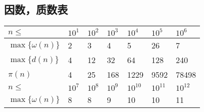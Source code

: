 \documentclass[twoside]{article}
\begin{document}
\subsection{因数，质数表}
\begin{table}[H]
\centering
\begin{tabular}{|l|llllll|}
\hline
\rowcolor[HTML]{C0C0C0} 
$n\le$              & \multicolumn{1}{l|}{\cellcolor[HTML]{C0C0C0}$10^1$}  & \multicolumn{1}{l|}{\cellcolor[HTML]{C0C0C0}$10^2$}  & \multicolumn{1}{l|}{\cellcolor[HTML]{C0C0C0}$10^3$}  & \multicolumn{1}{l|}{\cellcolor[HTML]{C0C0C0}$10^4$}    & \multicolumn{1}{l|}{\cellcolor[HTML]{C0C0C0}$10^5$}  & \cellcolor[HTML]{C0C0C0}$10^6$ \\ \hline
$\max\{\omega(n)\}$ & \multicolumn{1}{l|}{2}                               & \multicolumn{1}{l|}{3}                               & \multicolumn{1}{l|}{4}                               & \multicolumn{1}{l|}{5}                                 & \multicolumn{1}{l|}{26}                              & 7                              \\ \hline
$\max\{d(n)\}$      & \multicolumn{1}{l|}{4}                               & \multicolumn{1}{l|}{12}                              & \multicolumn{1}{l|}{32}                              & \multicolumn{1}{l|}{64}                                & \multicolumn{1}{l|}{128}                             & 240                            \\ \hline
$\pi(n)$            & \multicolumn{1}{l|}{4}                               & \multicolumn{1}{l|}{25}                              & \multicolumn{1}{l|}{168}                             & \multicolumn{1}{l|}{1229}                              & \multicolumn{1}{l|}{9592}                            & 78498                          \\ \hline
\rowcolor[HTML]{C0C0C0} 
$n\le$              & \multicolumn{1}{l|}{\cellcolor[HTML]{C0C0C0}$10^7$}  & \multicolumn{1}{l|}{\cellcolor[HTML]{C0C0C0}$10^8$}  & \multicolumn{1}{l|}{\cellcolor[HTML]{C0C0C0}$10^9$}  & \multicolumn{1}{l|}{\cellcolor[HTML]{C0C0C0}$10^{10}$} & \multicolumn{1}{l|}{\cellcolor[HTML]{C0C0C0}$10^{11}$} & $10^{12}$                        \\ \hline
$\max\{\omega(n)\}$ & \multicolumn{1}{l|}{8}                               & \multicolumn{1}{l|}{8}                               & \multicolumn{1}{l|}{9}                               & \multicolumn{1}{l|}{10}                                & \multicolumn{1}{l|}{10}                              & 11                             \\ \hline

\end{tabular}
\end{table}
\end{document}
